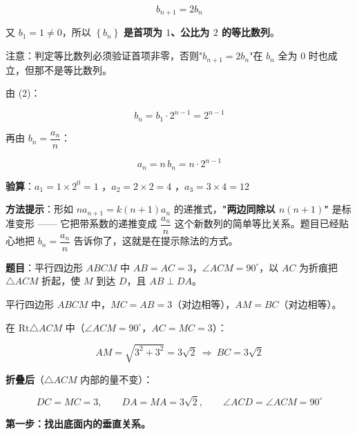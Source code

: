 \[b_{n+1}=2b_n\]

又 $b_1=1\ne0$，所以 $\left\{b_n\right\}$ \textbf{是首项为 $1$、公比为 $2$ 的等比数列}。

\begin{gktip}
注意：判定等比数列必须验证首项非零，否则"$b_{n+1}=2b_n$"在 $b_n$ 全为 $0$ 时也成立，但那不是等比数列。
\end{gktip}


由 (2)：

\[b_n=b_1\cdot2^{n-1}=2^{n-1}\]

再由 $b_n=\dfrac{a_n}n$：

\[a_n=n\,b_n=n\cdot2^{n-1}\]


\textbf{验算}：$a_1=1\times2^{0}=1$ ，$a_2=2\times2=4$ ，$a_3=3\times4=12$ 

\begin{gktip}
\textbf{方法提示}：形如 $na_{n+1}=k(n+1)a_n$ 的递推式，\textbf{"两边同除以 $n(n+1)$"} 是标准变形 —— 它把带系数的递推变成 $\dfrac{a_n}n$ 这个新数列的简单等比关系。题目已经贴心地把 $b_n=\dfrac{a_n}n$ 告诉你了，这就是在提示除法的方式。
\end{gktip}

\par\medskip


\textbf{题目}：平行四边形 $ABCM$ 中 $AB=AC=3$，$\angle ACM=90^\circ$，以 $AC$ 为折痕把 $\triangle ACM$ 折起，使 $M$ 到达 $D$，且 $AB\perp DA$。

\begin{center}\end{center}


平行四边形 $ABCM$ 中，$MC=AB=3$（对边相等），$AM=BC$（对边相等）。

在 $\mathrm{Rt}\triangle ACM$ 中（$\angle ACM=90^\circ$，$AC=MC=3$）：

\[AM=\sqrt{3^{2}+3^{2}}=3\sqrt2\ \Longrightarrow\ BC=3\sqrt2\]

\textbf{折叠后}（$\triangle ACM$ 内部的量不变）：

\[DC=MC=3,\qquad DA=MA=3\sqrt2,\qquad \angle ACD=\angle ACM=90^\circ\]


\textbf{第一步：找出底面内的垂直关系。}

